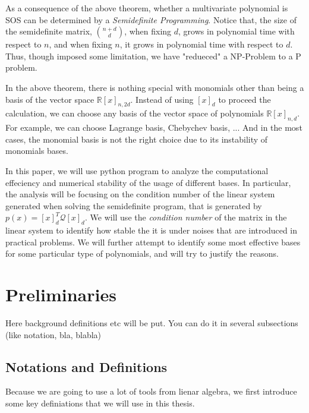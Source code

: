 \documentclass[12pt]{amsart}
\numberwithin{equation}{section}
\theoremstyle{definition}
\numberwithin{thm}{section}
\begin{document}
\cite{Blekherman:Parrilo:Thomas}

\cite{Laurent:Survey}

As a consequence of the above theorem, whether a multivariate polynomial is SOS can be determined 
by a \emph{Semidefinite Programming}. Notice that, the size of the semidefinite matrix,
${n+d \choose d}$, when fixing $d$, grows in polynomial time with respect to $n$, and when 
fixing $n$, it grows in polynomial time with respect to $d$. Thus, though imposed some 
limitation, we have "redueced" a NP-Problem to a P problem. 

In the above theorem, there is nothing special with monomials other than being a basis of the vector space $\mathbb{R}[x]_{n,2d}$. 
Instead of using $[x]_d$ to proceed the calculation,
we can choose any basis of the vector space of polynomials $\mathbb{R}[x]_{n,d}$. 
For example, we can choose Lagrange basis, Chebychev basis, ... And in the most cases,
the monomial basis is not the right choice due to its instability of monomials bases.

In this paper, we will use python program to analyze the computational effeciency and 
numerical stability of the usage of different bases. In particular, the analysis will
be focusing on the condition number of the linear system generated when solving the 
semidefinite program, that is generated by $p(x) = [x]_d^T \mathcal{Q} [x]_d $. 
We will use the \emph{condition number} of the matrix in the linear system to identify how stable the
it is under noises that are introduced in practical problems.  
We will further attempt to identify some most effective bases for some particular
type of polynomials, and will try to justify the reasons.  


\newpage

\section{Preliminaries}
\label{Sec:Preliminaries}

Here background definitions etc will be put. 
You can do it in several subsections (like notation, bla, blabla)

\subsection{Notations and Definitions}
\label{Sec:Notations and Definitions}

Because we are going to use a lot of tools from lienar algebra, we first introduce some key definiations that we will use in this thesis.
\end{document}
